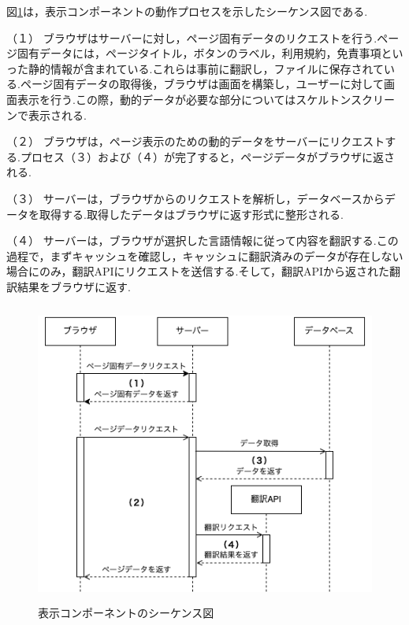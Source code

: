 \documentclass[b5paper,12pt,dvipdfmx]{jsreport}
\begin{document}
\newpage

図\ref{display_component_sequence_diagram}は，表示コンポーネントの動作プロセスを示したシーケンス図である.

（１）
ブラウザはサーバーに対し，ページ固有データのリクエストを行う.ページ固有データには，ページタイトル，ボタンのラベル，利用規約，免責事項といった静的情報が含まれている.これらは事前に翻訳し，ファイルに保存されている.ページ固有データの取得後，ブラウザは画面を構築し，ユーザーに対して画面表示を行う.この際，動的データが必要な部分についてはスケルトンスクリーンで表示される.

（２）
ブラウザは，ページ表示のための動的データをサーバーにリクエストする.プロセス（３）および（４）が完了すると，ページデータがブラウザに返される.

（３）
サーバーは，ブラウザからのリクエストを解析し，データベースからデータを取得する.取得したデータはブラウザに返す形式に整形される.

（４）
サーバーは，ブラウザが選択した言語情報に従って内容を翻訳する.この過程で，まずキャッシュを確認し，キャッシュに翻訳済みのデータが存在しない場合にのみ，翻訳APIにリクエストを送信する.そして，翻訳APIから返された翻訳結果をブラウザに返す.




\begin{figure}[H]
    \centering
    \includegraphics[width=120mm,height=99.33mm]{./img/components/display_component_sequence_diagram.png}
    \caption{表示コンポーネントのシーケンス図}
    \label{display_component_sequence_diagram}
\end{figure}
\end{document}
